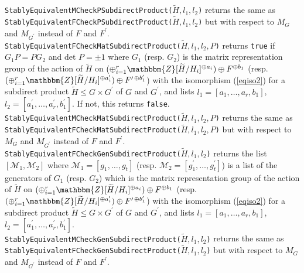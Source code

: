 \documentclass{amsart}
\theoremstyle{plain}
\theoremstyle{definition}
\theoremstyle{remark}
\newcommand{\bZ}{\mathbbm{Z}}\newcommand{\bQ}{\mathbbm{Q}}
\newcounter{sub}\def\tr{\mbox{tr }}
\begin{document}
\noindent
{\tt StablyEquivalentMCheckPSubdirectProduct($\widetilde{H},l_1,l_2$)}
returns the same as\\ 
{\tt StablyEquivalentFCheckPSubdirectProduct($\widetilde{H},l_1,l_2$)}  
but with respect to $M_G$ and $M_{G^\prime}$ 
instead of $F$ and $F^\prime$.\\

\noindent
{\tt StablyEquivalentFCheckMatSubdirectProduct($\widetilde{H},l_1,l_2,P$)} 
returns 
{\tt true} if $G_1P=PG_2$ and det $P=\pm 1$ where $G_1$ (resp. $G_2$) 
is the matrix representation group of the action of $\widetilde{H}$ 
on $(\oplus_{i=1}^r \bZ[\widetilde{H}/H_i]^{\oplus a_i})\oplus F^{\oplus b_1}$ (resp. 
$(\oplus_{i=1}^r \bZ[\widetilde{H}/H_i]^{\oplus a_i^{\prime}})\oplus F^{\prime\,\oplus b_1^{\prime}}$) 
with the isomorphism (\ref{eqiso2})
for a subdirect product 
$\widetilde{H}\leq G\times G^\prime$ of $G$ and $G^\prime$, 
and 
lists $l_1=[a_1,\ldots,a_r,b_1]$, 
$l_2=[a_1^{\prime},\ldots,a_r^{\prime},b_1^{\prime}]$. 
If not, this returns {\tt false}.\\

\noindent 
{\tt StablyEquivalentMCheckMatSubdirectProduct($\widetilde{H},l_1,l_2,P$)}
returns the same as\\ 
{\tt StablyEquivalentFCheckMatSubdirectProduct($\widetilde{H},l_1,l_2,P$)}
but with respect to $M_G$ and $M_{G^\prime}$ 
instead of $F$ and $F^\prime$.\\

\noindent
{\tt StablyEquivalentFCheckGenSubdirectProduct($\widetilde{H},l_1,l_2$)} 
returns 
the list $[\mathcal{M}_1,\mathcal{M}_2]$ where 
$\mathcal{M}_1=[g_1,\ldots,g_t]$ (resp. $\mathcal{M}_2=[g_1^{\prime},\ldots,g_t^{\prime}]$) 
is a list of the generators of $G_1$ (resp. $G_2$) 
which is the matrix representation group of the action of $\widetilde{H}$ 
on $(\oplus_{i=1}^r \bZ[\widetilde{H}/H_i]^{\oplus a_i})\oplus F^{\oplus b_1}$ (resp. 
$(\oplus_{i=1}^r \bZ[\widetilde{H}/H_i]^{\oplus a_i^{\prime}})\oplus F^{\prime\,\oplus b_1^{\prime}}$) 
with the isomorphism (\ref{eqiso2})
for a subdirect product 
$\widetilde{H}\leq G\times G^\prime$ of $G$ and $G^\prime$, 
and 
lists $l_1=[a_1,\ldots,a_r,b_1]$, 
$l_2=[a_1^{\prime},\ldots,a_r^{\prime},b_1^{\prime}]$.\\

\noindent 
{\tt StablyEquivalentMCheckGenSubdirectProduct($\widetilde{H},l_1,l_2$)} 
returns the same as\\  
{\tt StablyEquivalentFCheckGenSubdirectProduct($\widetilde{H},l_1,l_2$)} 
but with respect to $M_G$ and $M_{G^\prime}$ 
instead of $F$ and $F^\prime$.\\
\end{document}
